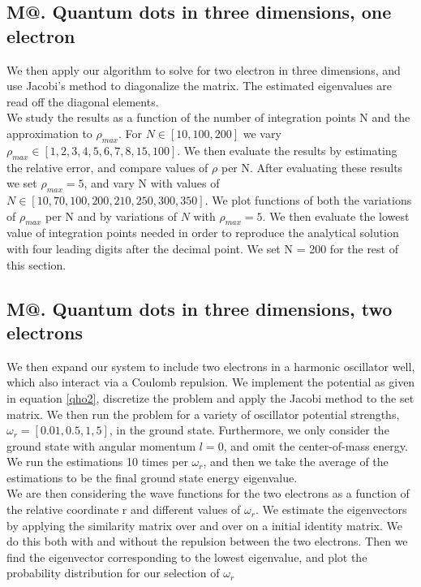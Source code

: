 \documentclass[%
reprint,
amsmath, 
amssymb, 
aps,]{revtex4-1}
\makeatletter
\newcommand*{\rom}[1]{\expandafter\@slowromancap\romannumeral #1@}
\makeatother
\begin{document}
		\subsection*{M\rom{3}. Quantum dots in three dimensions, one electron} \noindent 
We then apply our algorithm to solve for two electron in three dimensions, and use Jacobi's method to diagonalize the matrix. The estimated eigenvalues are read off the diagonal elements. \\ \indent We study the results as a function of the number of integration points N and the approximation to $\rho_{max}$. For $N\in[10,100,200]$ we vary $\rho_{max} \in [1, 2, 3, 4, 5, 6, 7, 8, 15, 100]$. We then evaluate the results by estimating the relative error, and compare values of $\rho$ per N. After evaluating these results we set $\rho_{max} = 5$, and vary N with values of $N\in[10, 70, 100, 200, 210, 250, 300, 350]$. We plot functions of both the variations of $\rho_{max}$ per N and by variations of $N$ with $\rho_{max} = 5$. We then evaluate the lowest value of integration points needed in order to reproduce the analytical solution with four leading digits after the decimal point. We set N = 200 for the rest of this section. 

		\subsection*{M\rom{4}. Quantum dots in three dimensions, two electrons} \noindent 
We then expand our system to include two electrons in a harmonic oscillator well, which also interact via a Coulomb repulsion. We implement the potential as given in equation \ref{qho2}, discretize the problem and apply the Jacobi method to the set matrix. We then run the problem for a variety of oscillator potential strengths, $\omega_r = [0.01,0.5,1,5]$, in the ground state. Furthermore, we only consider the ground state with angular momentum $l = 0$, and omit the center-of-mass energy. We run the estimations 10 times per $\omega_r$, and then we take the average of the estimations to be the final ground state energy eigenvalue.\\ \indent 
We are then considering the wave functions for the two electrons as a function of the relative coordinate r and different values of $\omega_r$. We estimate the eigenvectors by applying the similarity matrix over and over on a initial identity matrix. We do this both with and without the repulsion between the two electrons. Then we find the eigenvector corresponding to the lowest eigenvalue, and plot the probability distribution for our selection of $\omega_r$ 
\end{document}
